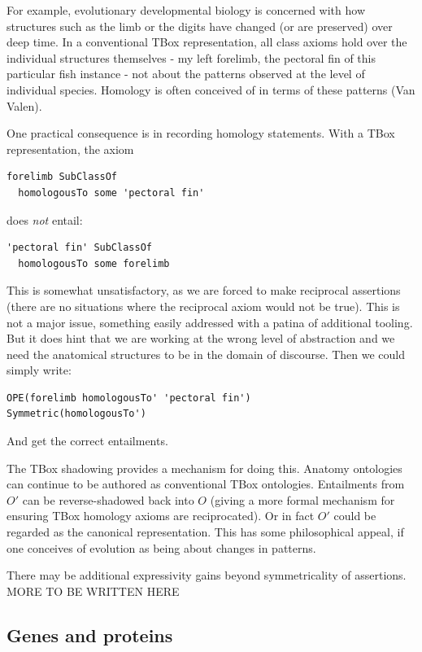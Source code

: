 \documentclass{my}
\begin{document}
For example, evolutionary developmental biology is concerned with how
structures such as the limb or the digits have changed (or are
preserved) over deep time. In a conventional TBox representation, all
class axioms hold over the individual structures themselves - my left
forelimb, the pectoral fin of this particular fish instance - not
about the patterns observed at the level of individual
species. Homology is often conceived of in terms of these patterns
(Van Valen).

One practical consequence is in recording homology statements. With a
TBox representation, the axiom

\begin{verbatim}
forelimb SubClassOf 
  homologousTo some 'pectoral fin'
\end{verbatim}

does \emph{not} entail:

\begin{verbatim}
'pectoral fin' SubClassOf 
  homologousTo some forelimb
\end{verbatim}

This is somewhat unsatisfactory, as we are forced to make reciprocal
assertions (there are no situations where the reciprocal axiom would
not be true). This is not a major issue, something easily addressed
with a patina of additional tooling. But it does hint that we are
working at the wrong level of abstraction and we need the anatomical
structures to be in the domain of discourse. Then we could simply
write:

\begin{verbatim}
OPE(forelimb homologousTo' 'pectoral fin')
Symmetric(homologousTo')
\end{verbatim}

And get the correct entailments. 

The TBox shadowing provides a mechanism for doing this. Anatomy
ontologies can continue to be authored as conventional TBox
ontologies. Entailments from $O'$ can be reverse-shadowed back into
$O$ (giving a more formal mechanism for ensuring TBox homology axioms
are reciprocated). Or in fact $O'$ could be regarded as the canonical
representation. This has some philosophical appeal, if one conceives
of evolution as being about changes in patterns.

There may be additional expressivity gains beyond symmetricality of
assertions. MORE TO BE WRITTEN HERE

\subsection{Genes and proteins}
\end{document}
